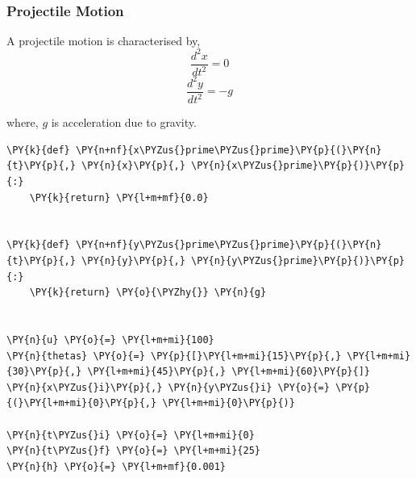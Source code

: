     \begin{center}
    \end{center}
    { \hspace*{\fill} \\}
    
    \hypertarget{projectile-motion}{%
\subsubsection{Projectile Motion}\label{projectile-motion}}

    A projectile motion is characterised by, \[\frac{d^2x}{dt^2} = 0\]
\[\frac{d^2y}{dt^2} = -g\]

where, \(g\) is acceleration due to gravity.

    \begin{tcolorbox}[breakable, size=fbox, boxrule=1pt, pad at break*=1mm,colback=cellbackground, colframe=cellborder]
\begin{Verbatim}[commandchars=\\\{\}]
\PY{k}{def} \PY{n+nf}{x\PYZus{}prime\PYZus{}prime}\PY{p}{(}\PY{n}{t}\PY{p}{,} \PY{n}{x}\PY{p}{,} \PY{n}{x\PYZus{}prime}\PY{p}{)}\PY{p}{:}
    \PY{k}{return} \PY{l+m+mf}{0.0}


\PY{k}{def} \PY{n+nf}{y\PYZus{}prime\PYZus{}prime}\PY{p}{(}\PY{n}{t}\PY{p}{,} \PY{n}{y}\PY{p}{,} \PY{n}{y\PYZus{}prime}\PY{p}{)}\PY{p}{:}
    \PY{k}{return} \PY{o}{\PYZhy{}} \PY{n}{g}


\PY{n}{u} \PY{o}{=} \PY{l+m+mi}{100}
\PY{n}{thetas} \PY{o}{=} \PY{p}{[}\PY{l+m+mi}{15}\PY{p}{,} \PY{l+m+mi}{30}\PY{p}{,} \PY{l+m+mi}{45}\PY{p}{,} \PY{l+m+mi}{60}\PY{p}{]}
\PY{n}{x\PYZus{}i}\PY{p}{,} \PY{n}{y\PYZus{}i} \PY{o}{=} \PY{p}{(}\PY{l+m+mi}{0}\PY{p}{,} \PY{l+m+mi}{0}\PY{p}{)}

\PY{n}{t\PYZus{}i} \PY{o}{=} \PY{l+m+mi}{0}
\PY{n}{t\PYZus{}f} \PY{o}{=} \PY{l+m+mi}{25}
\PY{n}{h} \PY{o}{=} \PY{l+m+mf}{0.001}
\end{Verbatim}
\end{tcolorbox}

